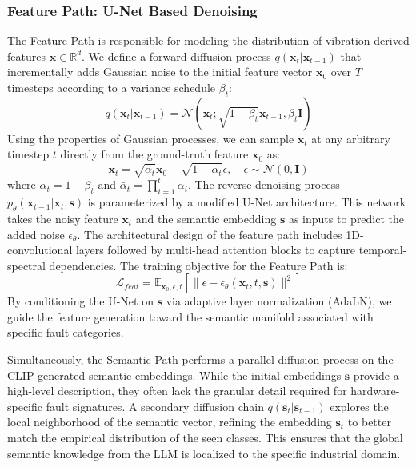 \documentclass[journal]{IEEEtran}
\begin{document}
\subsubsection{Feature Path: U-Net Based Denoising}
The Feature Path is responsible for modeling the distribution of vibration-derived features $\mathbf{x} \in \mathbb{R}^d$. We define a forward diffusion process $q(\mathbf{x}_t | \mathbf{x}_{t-1})$ that incrementally adds Gaussian noise to the initial feature vector $\mathbf{x}_0$ over $T$ timesteps according to a variance schedule $\beta_t$:
\begin{equation}
q(\mathbf{x}_t | \mathbf{x}_{t-1}) = \mathcal{N}(\mathbf{x}_t; \sqrt{1 - \beta_t} \mathbf{x}_{t-1}, \beta_t \mathbf{I})
\end{equation}
Using the properties of Gaussian processes, we can sample $\mathbf{x}_t$ at any arbitrary timestep $t$ directly from the ground-truth feature $\mathbf{x}_0$ as:
\begin{equation}
\mathbf{x}_t = \sqrt{\bar{\alpha}_t} \mathbf{x}_0 + \sqrt{1 - \bar{\alpha}_t} \epsilon, \quad \epsilon \sim \mathcal{N}(0, \mathbf{I})
\end{equation}
where $\alpha_t = 1 - \beta_t$ and $\bar{\alpha}_t = \prod_{i=1}^t \alpha_i$. The reverse denoising process $p_\theta(\mathbf{x}_{t-1} | \mathbf{x}_t, \mathbf{s})$ is parameterized by a modified U-Net architecture. This network takes the noisy feature $\mathbf{x}_t$ and the semantic embedding $\mathbf{s}$ as inputs to predict the added noise $\epsilon_\theta$. The architectural design of the feature path includes 1D-convolutional layers followed by multi-head attention blocks to capture temporal-spectral dependencies. The training objective for the Feature Path is:
\begin{equation}
\mathcal{L}_{feat} = \mathbb{E}_{\mathbf{x}_0, \epsilon, t} \left[ \| \epsilon - \epsilon_\theta(\mathbf{x}_t, t, \mathbf{s}) \|^2 \right]
\end{equation}
By conditioning the U-Net on $\mathbf{s}$ via adaptive layer normalization (AdaLN), we guide the feature generation toward the semantic manifold associated with specific fault categories.

Simultaneously, the Semantic Path performs a parallel diffusion process on the CLIP-generated semantic embeddings. While the initial embeddings $\mathbf{s}$ provide a high-level description, they often lack the granular detail required for hardware-specific fault signatures. A secondary diffusion chain $q(\mathbf{s}_t | \mathbf{s}_{t-1})$ explores the local neighborhood of the semantic vector, refining the embedding $\mathbf{s}_t$ to better match the empirical distribution of the seen classes. This ensures that the global semantic knowledge from the LLM is localized to the specific industrial domain.
\end{document}
